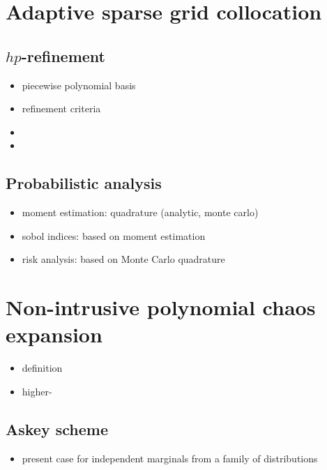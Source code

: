 \section{Adaptive sparse grid collocation}
\label{sec:adaptive-sparse-grid}

\subsection{$hp$-refinement}
\label{sec:hp-refinement}

\begin{itemize}
\item piecewise polynomial basis
\item refinement criteria
\item {}
\item {}
\end{itemize}

\subsection{Probabilistic analysis}
\label{sec:probabi-analysis}

\begin{itemize}
\item moment estimation: quadrature (analytic, monte carlo)
\item sobol indices: based on moment estimation
\item risk analysis: based on Monte Carlo quadrature
\end{itemize}

\section{Non-intrusive polynomial chaos expansion}
\label{sec:non-intr-polyn}

\begin{itemize}
\item definition
\item higher-
\end{itemize}

\subsection{Askey scheme}
\label{sec:askey-scheme}

\begin{itemize}
\item present case for independent marginals from a family of
  distributions
\end{itemize}


